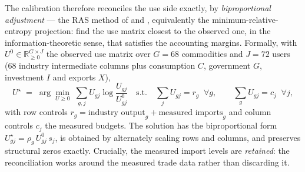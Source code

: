 \documentclass[11pt,a4paper]{article}
\begin{document}
The calibration therefore reconciles the use side exactly, by \emph{biproportional adjustment} ---
the RAS method of \citet{stone1961} and \citet{bacharach1970}, equivalently the
minimum-relative-entropy projection: find the use matrix closest to the observed one, in the
information-theoretic sense, that satisfies the accounting margins. Formally, with
$U^{0}\in\mathbb{R}_{\ge0}^{G\times J}$ the observed use matrix over $G=68$ commodities and
$J=72$ users (68 industry intermediate columns plus consumption $C$, government $G$, investment
$I$ and exports $X$),
\begin{equation}
  U^{\star} \;=\; \arg\min_{U\ge 0}\;\sum_{g,j} U_{gj}\log\frac{U_{gj}}{U^{0}_{gj}}
  \quad\text{s.t.}\quad
  \sum_j U_{gj} = r_g \;\;\forall g,
  \qquad \sum_g U_{gj} = c_j \;\;\forall j,
  \label{eq:ras}
\end{equation}
with row controls $r_g = \text{industry output}_g + \text{measured imports}_g$ and column controls
$c_j$ the measured budgets. The solution has the biproportional form
$U^{\star}_{gj}=\rho_g\,U^{0}_{gj}\,s_j$, is obtained by alternately scaling rows and columns, and
preserves structural zeros exactly. Crucially, the measured import levels are \emph{retained}: the
reconciliation works around the measured trade data rather than discarding it.
\end{document}
